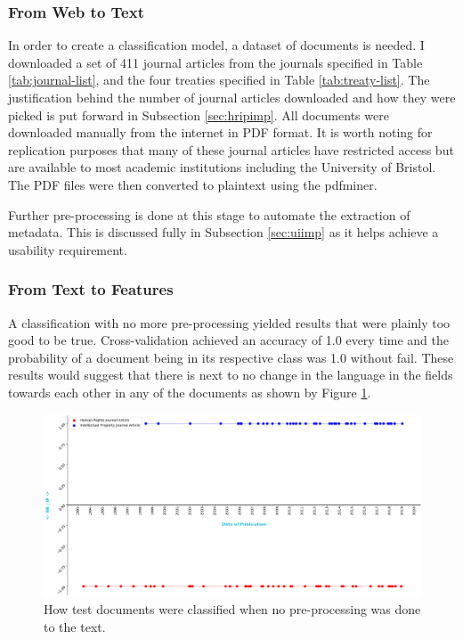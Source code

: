 			\subsubsection{From Web to Text}\label{sec:webtotext}
				In order to create a classification model, a dataset of documents is needed. I downloaded a set of 411 journal articles from the journals specified in Table \ref{tab:journal-list}, and the four treaties specified in Table \ref{tab:treaty-list}. The justification behind the number of journal articles downloaded and how they were picked is put forward in Subsection \ref{sec:hripimp}. All documents were downloaded manually from the internet in PDF format. It is worth noting for replication purposes that many of these journal articles have restricted access but are available to most academic institutions including the University of Bristol. The PDF files were then converted to plaintext using the pdfminer.
				
				Further pre-processing is done at this stage to automate the extraction of metadata. This is discussed fully in Subsection \ref{sec:uiimp} as it helps achieve a usability requirement.
			\subsubsection{From Text to Features}
				A classification with no more pre-processing yielded results that were plainly too good to be true. Cross-validation achieved an accuracy of 1.0 every time and the probability of a document being in its respective class was 1.0 without fail. These results would suggest that there is next to no change in the language in the fields towards each other in any of the documents as shown by Figure \ref{fig:no_preprocessing}. 
				
			    \begin{figure}
    			    \centering
        			\includegraphics[width=0.9\linewidth]{resources/images/no_preprocessing.png}
        			\caption{How test documents were classified when no pre-processing was done to the text.}
        			\label{fig:no_preprocessing}
	    		\end{figure}
				
